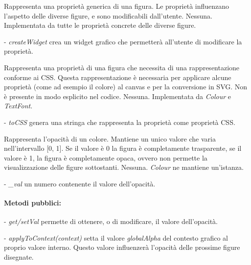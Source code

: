 Rappresenta una propriet\`a generica di una figura. Le propriet\`a influenzano 
l'aspetto delle diverse figure, e sono modificabili dall'utente.
Nessuna.
Implementata da tutte le propriet\`a concrete delle diverse figure.
\begin{elencopuntato}[\normindent]
\item[-] \textit{createWidget} crea un widget grafico che permetter\`a all'utente di modificare la propriet\`a.
\end{elencopuntato}

Rappresenta una propriet\`a di una figura che necessita di una rappresentazione conforme ai CSS. Questa rappresentazione \`e necessaria per applicare alcune propriet\`a (come ad esempio il colore) al canvas e per la conversione in SVG. Non \`e presente in modo esplicito nel codice.
Nessuna.
Implementata da \textit{Colour} e \textit{TextFont}. 
\begin{elencopuntato}[\normindent]
\item[-] \textit{toCSS} genera una stringa che rappresenta la propriet\`a come propriet\`a CSS.
\end{elencopuntato}

Rappresenta l'opacit\`a di un colore. Mantiene un unico valore che varia nell'intervallo [0, 1]. Se il valore \`e 0 la figura \`e completamente trasparente, se
il valore \`e 1, la figura \`e completamente opaca, ovvero non permette la visualizzazione delle figure sottostanti.
Nessuna.
\textit{Colour} ne mantiene un'istanza.
\begin{elencopuntato}[\normindent]
\item[-] \textit{\_val} un numero contenente il valore dell'opacit\`a.
\end{elencopuntato}
\paragraph{Metodi pubblici:}
\begin{elencopuntato}[\normindent]
\item[-] \textit{get/setVal} permette di ottenere, o di modificare, il valore dell'opacit\`a.
\item[-] \textit{applyToContext(context)} setta il valore \textit{globalAlpha} del contesto grafico al proprio valore interno. Questo valore influenzer\`a l'opacit\`a delle prossime figure disegnate.
\end{elencopuntato}

